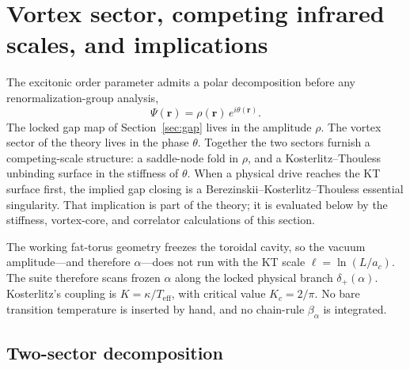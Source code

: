 \section{Vortex sector, competing infrared scales, and \BKT{} implications}
\label{sec:vortex_rg}

The excitonic order parameter admits a polar decomposition before any renormalization-group analysis,
\begin{equation}
\Psi(\mathbf{r})=\rho(\mathbf{r})\,e^{i\theta(\mathbf{r})}.
\label{eq:polar}
\end{equation}
The locked gap map of Section~\ref{sec:gap} lives in the amplitude $\rho$. The vortex sector of the theory lives in the phase $\theta$. Together the two sectors furnish a competing-scale structure: a saddle-node fold in $\rho$, and a Kosterlitz--Thouless unbinding surface in the stiffness of $\theta$. When a physical drive reaches the KT surface first, the implied gap closing is a Berezinskii--Kosterlitz--Thouless essential singularity. That implication is part of the theory; it is evaluated below by the stiffness, vortex-core, and correlator calculations of this section.

The working fat-torus geometry freezes the toroidal cavity, so the vacuum amplitude---and therefore $\alpha$---does not run with the KT scale $\ell=\ln(L/a_c)$. The suite therefore scans frozen $\alpha$ along the locked physical branch $\delta_+(\alpha)$. Kosterlitz's coupling is $K=\kappa/T_{\mathrm{eff}}$, with critical value $K_c=2/\pi$. No bare transition temperature is inserted by hand, and no chain-rule $\beta_\alpha$ is integrated.

\begin{center}
\end{center}

\subsection{Two-sector decomposition}
\label{sec:two_sector}

